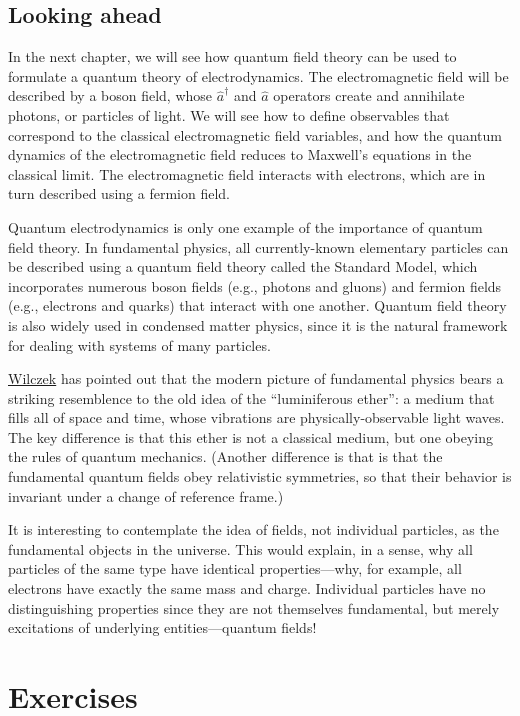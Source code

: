 \documentclass[prx,12pt]{revtex4-2}
\begin{document}
\subsection{Looking ahead}
\label{sec:outlook}

In the next chapter, we will see how quantum field theory can be used
to formulate a quantum theory of electrodynamics.  The electromagnetic
field will be described by a boson field, whose $\hat{a}^\dagger$ and
$\hat{a}$ operators create and annihilate photons, or particles of
light.  We will see how to define observables that correspond to the
classical electromagnetic field variables, and how the quantum
dynamics of the electromagnetic field reduces to Maxwell's equations
in the classical limit.  The electromagnetic field interacts with
electrons, which are in turn described using a fermion field.

Quantum electrodynamics is only one example of the importance of
quantum field theory.  In fundamental physics, all currently-known
elementary particles can be described using a quantum field theory
called the Standard Model, which incorporates numerous boson fields
(e.g., photons and gluons) and fermion fields (e.g., electrons and
quarks) that interact with one another.  Quantum field theory is also
widely used in condensed matter physics, since it is the natural
framework for dealing with systems of many particles.

\hyperref[cite:wilczek]{Wilczek} has pointed out that the modern
picture of fundamental physics bears a striking resemblence to the old
idea of the ``luminiferous ether'': a medium that fills all of space
and time, whose vibrations are physically-observable light waves.  The
key difference is that this ether is not a classical medium, but one
obeying the rules of quantum mechanics.  (Another difference is that
is that the fundamental quantum fields obey relativistic symmetries,
so that their behavior is invariant under a change of reference
frame.)

It is interesting to contemplate the idea of fields, not individual
particles, as the fundamental objects in the universe.  This would
explain, in a sense, why all particles of the same type have identical
properties---why, for example, all electrons have exactly the same
mass and charge.  Individual particles have no distinguishing
properties since they are not themselves fundamental, but merely
excitations of underlying entities---quantum fields!

\section*{Exercises}
\end{document}

